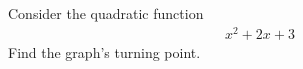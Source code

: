 Consider the quadratic function
\begin{align*}
x^2 + 2x + 3
\end{align*}
Find the graph's turning point. 
